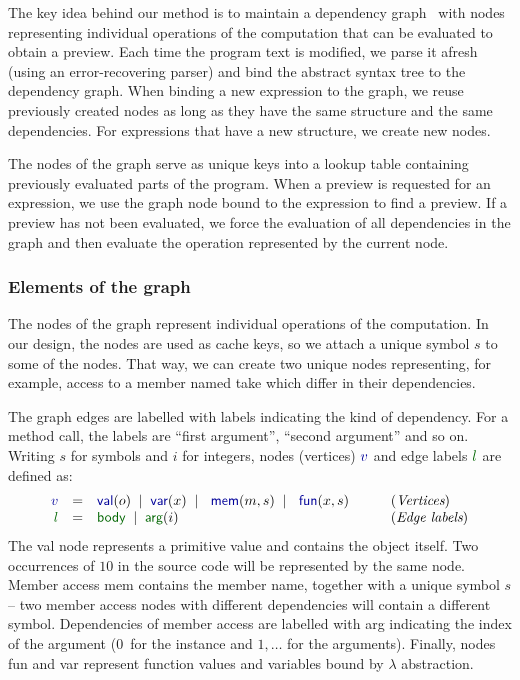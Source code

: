 \documentclass[english,crc,references=cleveref]{programming}
\theoremstyle{plain}
\theoremstyle{definition}
\newcommand{\lsep}{\;\;|\;\;}
\newcommand{\Num}[1]{\num[color=numclr]{#1}}
\newcommand{\ident}[1]{\textnormal{\textcolor{idclr}{\sffamily #1}}}
\newcommand{\bndclr}[1]{\textcolor{kvdclr}{#1}}
\newcommand{\blblclr}[1]{\textcolor{numclr}{#1}}
\newcommand{\bnd}[1]{\textnormal{\textcolor{kvdclr}{\sffamily #1}}}
\newcommand{\blbl}[1]{\textnormal{\textcolor{numclr}{\sffamily #1}}}
\begin{document}
The key idea behind our method is to maintain a dependency graph~\cite{dependencies} with
nodes representing individual operations of the computation that can be evaluated
to obtain a preview. Each time the program text is modified, we parse it afresh (using an
error-recovering parser) and bind the abstract syntax tree to the dependency graph.
When binding a new expression to the graph, we reuse previously created nodes as long as
they have the same structure and the same dependencies. For expressions that have a new
structure, we create new nodes.

The nodes of the graph serve as unique keys into a lookup table containing previously
evaluated parts of the program. When a preview is requested for an expression, we use the graph
node bound to the expression to find a preview. If a preview has not been evaluated, we force
the evaluation of all dependencies in the graph and then evaluate the operation represented by
the current node.


\subsubsection{Elements of the graph}
The nodes of the graph represent individual operations of the computation. In our design, the nodes
are used as cache keys, so we attach a unique symbol $s$ to some of the nodes. That way, we can
create two unique nodes representing, for example, access to a member named \ident{take} which
differ in their dependencies.

The graph edges are labelled with labels indicating the kind of dependency. For
a method call, the labels are ``first argument'', ``second argument'' and so on. Writing
$s$ for symbols and $i$ for integers, nodes (vertices) $\bndclr{v}$ and edge labels $\blblclr{l}$
are defined as:
%
\begin{equation*}
\begin{array}{rcll}
\bndclr{v}&=&\bnd{val}(o) \lsep \bnd{var}(x)\lsep \bnd{mem}(m, s)\lsep \bnd{fun}(x, s)&\qquad(\textit{Vertices})\\
\blblclr{l}&=&\blbl{body} \lsep \blbl{arg}(i)&\qquad(\textit{Edge labels})\\
\end{array}
\end{equation*}
%
The \bnd{val} node represents a primitive value and contains the object itself. Two occurrences
of $\Num{10}$ in the source code will be represented by the same node. Member access \bnd{mem}
contains the member name, together with a unique symbol $s$ -- two member access nodes with
different dependencies will contain a different symbol. Dependencies of member access are labelled
with \blbl{arg} indicating the index of the argument ($0$~for the instance and $1,\ldots$ for the
arguments). Finally, nodes \bnd{fun} and \bnd{var} represent function values and variables
bound by $\lambda$ abstraction.
\end{document}
